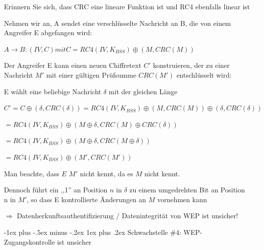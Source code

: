 \documentclass[a4paper]{article}
\makeatletter
\renewcommand{\subsubsection}{\@startsection{subsubsection}{3}{0mm}%
 {-1ex plus -.5ex minus -.2ex}%
 {1ex plus .2ex}%
 {\normalfont\small\bfseries}}
\makeatother
\begin{document}
\begin{multicols}{3}
      \begin{itemize*}
            \item Erinnern Sie sich, dass CRC eine lineare Funktion ist und RC4
            ebenfalls linear ist
            \item Nehmen wir an, A sendet eine verschlüsselte Nachricht an B, die von
            einem Angreifer E abgefangen wird:
            \begin{itemize*}
                  \item $A \rightarrow B: (IV, C) mit C = RC4(IV, K_{BSS}) \oplus (M, CRC(M))$
            \end{itemize*}
            \item Der Angreifer E kann einen neuen Chiffretext $C'$ konstruieren, der
            zu einer Nachricht $M'$ mit einer gültigen Prüfsumme $CRC(M')$
            entschlüsselt wird:
            \begin{itemize*}
                  \item E wählt eine beliebige Nachricht $\delta$ mit der gleichen Länge
                  \item $C' = C \oplus (\delta, CRC(\delta)) = RC4(IV, K_{BSS}) \oplus (M, CRC(M)) \oplus (\delta, CRC(\delta))$
                  \item $= RC4(IV, K_{BSS}) \oplus (M \oplus \delta, CRC(M) \oplus CRC(\delta))$
                  \item $= RC4(IV, K_{BSS}) \oplus (M \oplus \delta, CRC(M \oplus \delta))$
                  \item $= RC4(IV, K_{BSS}) \oplus (M', CRC(M'))$
                  \item Man beachte, dass $E$ $M'$ nicht kennt, da es $M$ nicht kennt.
                  \item Dennoch führt ein ,,1'' an Position $n$ in $\delta$ zu einem umgedrehten Bit an Position n in $M'$, so dass E kontrollierte Änderungen an $M$ vornehmen kann
                  \item $\Rightarrow$ Datenherkunftsauthentifizierung / Datenintegrität von WEP ist unsicher!
            \end{itemize*}
      \end{itemize*}


      \subsubsection{Schwachstelle \#4: WEP-Zugangskontrolle ist
            unsicher}


\end{multicols}
\end{document}
